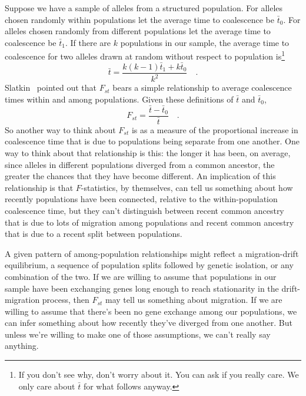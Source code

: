 \documentclass[12pt]{article}
\begin{document}
Suppose we have a sample of alleles from a structured population. For
alleles chosen randomly within populations let the average time to
coalescence be $\bar t_0$. For alleles chosen randomly from different
populations let the average time to coalescence be $\bar t_1$. If
there are $k$ populations in our sample, the average time to
coalescence for two alleles drawn at random without respect to
population is\footnote{If you don't see why, don't worry about it. You
can ask if you really care. We only care about $\bar t$ for what
follows anyway.}
\[
\bar t = \frac{k(k-1)\bar t_1 + k\bar t_0}
              {k^2} \quad .
\]
Slatkin~\cite{Slatkin-1991} pointed out that $F_{st}$ bears a simple
relationship to average coalescence times within and among
populations. Given these definitions of $\bar t$ and $\bar t_0$,
\[
F_{st} = \frac{\bar t - \bar t_0}{\bar t} \quad .
\]
So another way to think about $F_{st}$ is as a measure of the
proportional increase in coalescence time that is due to populations
being separate from one another. One way to think about that
relationship is this: the longer it has been, on average, since
alleles in different populations diverged from a common ancestor, the
greater the chances that they have become different. An implication of
this relationship is that $F$-statistics, by themselves, can tell us
something about how recently populations have been connected, relative
to the within-population coalescence time, but they can't distinguish
between recent common ancestry that is due to lots of migration among
populations and recent common ancestry that is due to a recent split
between populations.

A given pattern of among-population relationships might reflect a
migration-drift equilibrium, a sequence of population splits followed
by genetic isolation, or any combination of the two. If we are willing
to assume that populations in our sample have been exchanging genes
long enough to reach stationarity in the drift-migration process, then
$F_{st}$ may tell us something about migration. If we are willing to
assume that there's been no gene exchange among our populations, we
can infer something about how recently they've diverged from one
another. But unless we're willing to make one of those assumptions, we
can't really say anything.




\ccLicense
\end{document}
